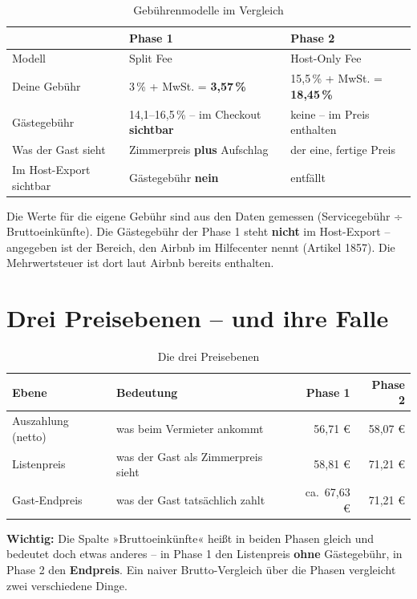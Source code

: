 \documentclass[11pt,a4paper]{article}
\newcommand{\hinweis}[1]{\par\vspace{3pt}\noindent\textcolor{grau}{\small #1}\par\vspace{5pt}}
\begin{document}
\begin{table}[H]
\centering
\begin{tabular}{@{}p{4.6cm}p{4.6cm}p{4.9cm}@{}}
\toprule
 & \textbf{Phase 1} & \textbf{Phase 2} \\
\midrule
Modell & Split Fee & Host-Only Fee \\
Deine Gebühr & 3\,\% + MwSt. = \textbf{3,57\,\%} & 15,5\,\% + MwSt. = \textbf{18,45\,\%} \\
Gästegebühr & 14,1--16,5\,\% – im Checkout \textbf{sichtbar} & keine – im Preis enthalten \\
Was der Gast sieht & Zimmerpreis \textbf{plus} Aufschlag & der eine, fertige Preis \\
Im Host-Export sichtbar & Gästegebühr \textbf{nein} & entfällt \\
\bottomrule
\end{tabular}
\caption{Gebührenmodelle im Vergleich}
\end{table}

Die Werte für die eigene Gebühr sind aus den Daten gemessen (Servicegebühr ÷
Bruttoeinkünfte). Die Gästegebühr der Phase 1 steht \textbf{nicht} im Host-Export –
angegeben ist der Bereich, den Airbnb im Hilfecenter nennt (Artikel 1857). Die
Mehrwertsteuer ist dort laut Airbnb bereits enthalten.

\section{Drei Preisebenen – und ihre Falle}

\begin{table}[H]
\centering
\begin{tabular}{@{}p{4.0cm}p{5.6cm}rr@{}}
\toprule
\textbf{Ebene} & \textbf{Bedeutung} & \textbf{Phase 1} & \textbf{Phase 2} \\
\midrule
Auszahlung (netto) & was beim Vermieter ankommt & 56,71 € & 58,07 € \\
Listenpreis & was der Gast als Zimmerpreis sieht & 58,81 € & 71,21 € \\
Gast-Endpreis & was der Gast tatsächlich zahlt & ca.\ 67,63 € & 71,21 € \\
\bottomrule
\end{tabular}
\caption{Die drei Preisebenen}
\end{table}

\hinweis{\textbf{Wichtig:} Die Spalte »Bruttoeinkünfte« heißt in beiden Phasen gleich und
bedeutet doch etwas anderes – in Phase 1 den Listenpreis \textbf{ohne} Gästegebühr, in
Phase 2 den \textbf{Endpreis}. Ein naiver Brutto-Vergleich über die Phasen vergleicht
zwei verschiedene Dinge.}
\end{document}
